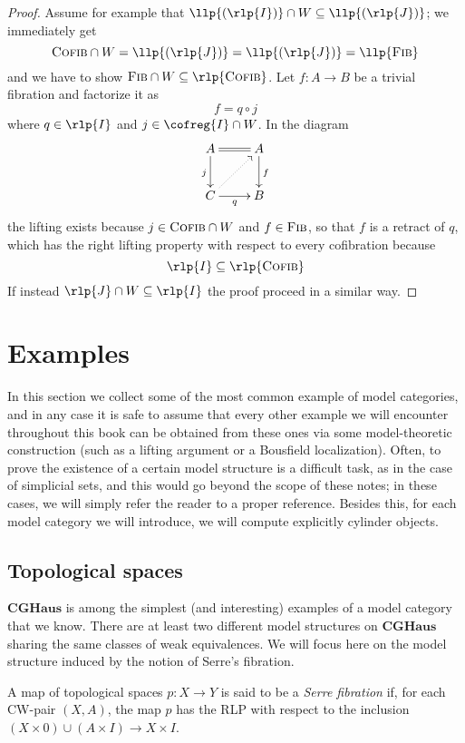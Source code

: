 \begin{refsection}
\begin{proof}
Assume for example that $\llp{(\rlp{I})} \cap W \subseteq \llp{(\rlp{J})}$; we immediately get
\[
\cofib \cap W = \llp{(\rlp{J})} = \llp{(\rlp{J})} = \llp{\fib}
\]
and we have to show $\fib \cap W \subseteq \rlp{\cofib}$. Let $f \colon A \to B$ be a trivial fibration and factorize it as
\[
f = q \circ j
\]
where $q \in \rlp{I}$ and $j \in \cofreg{I} \cap W$. In the diagram
\[
\xymatrix{
A \ar[d]_j \ar@{=}[r] & A \ar[d]^f \\ C \ar[r]_q \ar@{.>}[ur] & B
}
\]
the lifting exists because $j \in \textsc{Cofib} \cap W$ and $f \in \textsc{Fib}$, so that $f$ is a retract of $q$, which has the right lifting property with respect to every cofibration because
\[
\rlp{I} \subseteq \rlp{\cofib}
\]
If instead $\rlp{J} \cap W \subseteq \rlp{I}$ the proof proceed in a similar way.
\end{proof}

\section{Examples}

In this section we collect some of the most common example of model categories, and in any case it is safe to assume that every other example we will encounter throughout this book can be obtained from these ones via some model-theoretic construction (such as a lifting argument or a Bousfield localization). Often, to prove the existence of a certain model structure is a difficult task, as in the case of simplicial sets, and this would go beyond the scope of these notes; in these cases, we will simply refer the reader to a proper reference. Besides this, for each model category we will introduce, we will compute explicitly cylinder objects.

\subsection{Topological spaces}  \label{topological spaces}

$\mathbf{CGHaus}$ is among the simplest (and interesting) examples of a model category that we know. There are at least two different model structures on $\mathbf{CGHaus}$ sharing the same classes of weak equivalences. We will focus here on the model structure induced by the notion of Serre's fibration.

\begin{defin}
A map of topological spaces $p \colon X \to Y$ is said to be a \emph{Serre fibration} if, for each CW-pair $(X,A)$, the map $p$ has the RLP with respect to the inclusion $(X \times 0) \cup (A \times I) \to X \times I$.
\end{defin}


\end{refsection}
